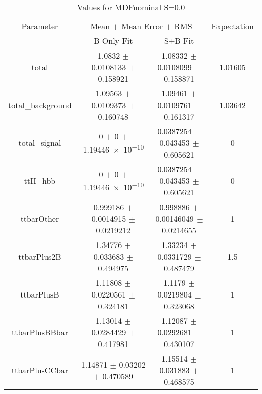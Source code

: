 \begin{table}
\centering
\caption{Values for MDFnominal S=0.0}
\begin{tabular}{cccc}
\toprule
Parameter & \multicolumn{2}{c}{Mean $\pm$ Mean Error $\pm$ RMS} & Expectation\\
 & B-Only Fit & S+B Fit & \\
\midrule
total & \num{1.0832} $\pm$ \num{0.0108133} $\pm$ \num{0.158921} & \num{1.08332} $\pm$ \num{0.0108099} $\pm$ \num{0.158871} & \num{1.01605}\\
total\_background & \num{1.09563} $\pm$ \num{0.0109373} $\pm$ \num{0.160748} & \num{1.09461} $\pm$ \num{0.0109761} $\pm$ \num{0.161317} & \num{1.03642}\\
total\_signal & \num{0} $\pm$ \num{0} $\pm$ \num{1.19446e-10} & \num{0.0387254} $\pm$ \num{0.043453} $\pm$ \num{0.605621} & \num{0}\\
ttH\_hbb & \num{0} $\pm$ \num{0} $\pm$ \num{1.19446e-10} & \num{0.0387254} $\pm$ \num{0.043453} $\pm$ \num{0.605621} & \num{0}\\
ttbarOther & \num{0.999186} $\pm$ \num{0.0014915} $\pm$ \num{0.0219212} & \num{0.998886} $\pm$ \num{0.00146049} $\pm$ \num{0.0214655} & \num{1}\\
ttbarPlus2B & \num{1.34776} $\pm$ \num{0.033683} $\pm$ \num{0.494975} & \num{1.33234} $\pm$ \num{0.0331729} $\pm$ \num{0.487479} & \num{1.5}\\
ttbarPlusB & \num{1.11808} $\pm$ \num{0.0220561} $\pm$ \num{0.324181} & \num{1.1179} $\pm$ \num{0.0219804} $\pm$ \num{0.323068} & \num{1}\\
ttbarPlusBBbar & \num{1.13014} $\pm$ \num{0.0284429} $\pm$ \num{0.417981} & \num{1.12087} $\pm$ \num{0.0292681} $\pm$ \num{0.430107} & \num{1}\\
ttbarPlusCCbar & \num{1.14871} $\pm$ \num{0.03202} $\pm$ \num{0.470589} & \num{1.15514} $\pm$ \num{0.031883} $\pm$ \num{0.468575} & \num{1}\\
\bottomrule
\end{tabular}
\end{table}
